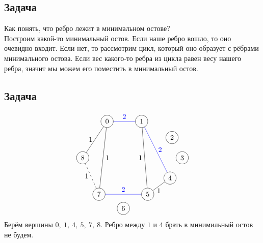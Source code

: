 \documentclass[12pt, a4paper]{article}
\begin{document}
    \subsection*{Задача}
    Как понять, что ребро лежит в минимальном остове?\\
    Построим какой-то минимальный остов. Если наше ребро вошло, то оно очевидно входит. Если нет, то рассмотрим цикл, который оно образует с рёбрами минимального остова. Если вес какого-то ребра из цикла равен весу нашего ребра, значит мы можем его поместить в минимальный остов.
    \subsection*{Задача}
    \[\begin{tikzpicture}[every circle node/.style={draw}]
        \draw (0, 0) node[circle](0){0};
        \draw (1.7, 0) node[circle](1){1};
        \draw (3.2, -0.8) node[circle](2){2};
        \draw (3.7, -1.8) node[circle](3){3};
        \draw (3.1, -2.8) node[circle](4){4};
        \draw (2, -3.6) node[circle](5){5};
        \draw (0.8, -4.3) node[circle](6){6};
        \draw (-0.4, -3.6) node[circle](7){7};
        \draw (-1.2, -1.8) node[circle](8){8};
        \draw[blue] (0) -- node[anchor=south]{2} (1);
        \draw[blue] (1) -- node[anchor=west](cross){2} (4);
        \draw (1) -- node[anchor=east]{1} (5);
        \draw (4) -- node[anchor=north]{1} (5);
        \draw[blue] (5) -- node[anchor=south]{2} (7);
        \draw (0) -- node[anchor=west]{1} (7);
        \draw (0) -- node[anchor=east]{1} (8);
        \draw[dashed] (7) -- node[anchor=east]{1} (8);
    \end{tikzpicture}\]
    Берём вершины $0,\ 1,\ 4,\ 5,\ 7,\ 8$. Ребро между $1$ и $4$ брать в минимильный остов не будем.
    \newpage
\end{document}
